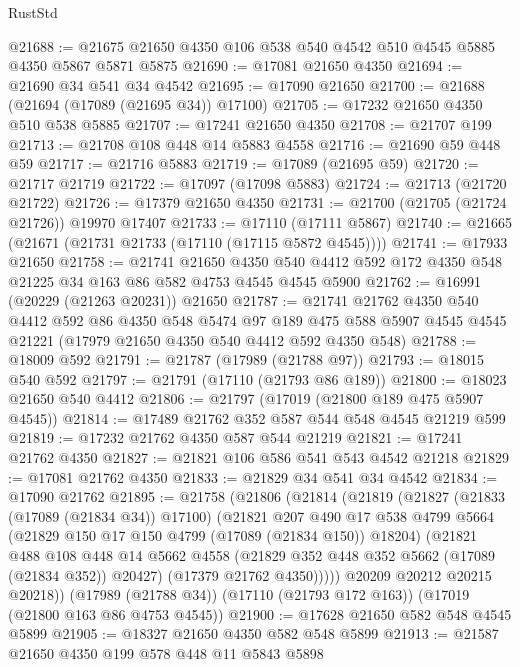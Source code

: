 \begin{lexlean}{RustStd}
\begin{coremodule}
@21688 := @21675 @21650 @4350 @106 @538 @540 @4542 @510 @4545 @5885 @4350 @5867 @5871 @5875
@21690 := @17081 @21650 @4350
@21694 := @21690 @34 @541 @34 @4542
@21695 := @17090 @21650
@21700 := @21688 (@21694 (@17089 (@21695 @34)) @17100)
@21705 := @17232 @21650 @4350 @510 @538 @5885
@21707 := @17241 @21650 @4350
@21708 := @21707 @199
@21713 := @21708 @108 @448 @14 @5883 @4558
@21716 := @21690 @59 @448 @59
@21717 := @21716 @5883
@21719 := @17089 (@21695 @59)
@21720 := @21717 @21719
@21722 := @17097 (@17098 @5883)
@21724 := @21713 (@21720 @21722)
@21726 := @17379 @21650 @4350
@21731 := @21700 (@21705 (@21724 @21726)) @19970 @17407
@21733 := @17110 (@17111 @5867)
@21740 := @21665 (@21671 (@21731 @21733 (@17110 (@17115 @5872 @4545))))
@21741 := @17933 @21650
@21758 := @21741
    @21650
    @4350
    @540
    @4412
    @592
    @172
    @4350
    @548
    @21225
    @34
    @163
    @86
    @582
    @4753
    @4545
    @4545
    @5900
@21762 := @16991 (@20229 (@21263 @20231)) @21650
@21787 := @21741
    @21762
    @4350
    @540
    @4412
    @592
    @86
    @4350
    @548
    @5474
    @97
    @189
    @475
    @588
    @5907
    @4545
    @4545
    @21221
    (@17979 @21650 @4350 @540 @4412 @592 @4350 @548)
@21788 := @18009 @592
@21791 := @21787 (@17989 (@21788 @97))
@21793 := @18015 @540 @592
@21797 := @21791 (@17110 (@21793 @86 @189))
@21800 := @18023 @21650 @540 @4412
@21806 := @21797 (@17019 (@21800 @189 @475 @5907 @4545))
@21814 := @17489 @21762 @352 @587 @544 @548 @4545 @21219 @599
@21819 := @17232 @21762 @4350 @587 @544 @21219
@21821 := @17241 @21762 @4350
@21827 := @21821 @106 @586 @541 @543 @4542 @21218
@21829 := @17081 @21762 @4350
@21833 := @21829 @34 @541 @34 @4542
@21834 := @17090 @21762
@21895 := @21758
    (@21806
      (@21814
        (@21819
          (@21827
            (@21833 (@17089 (@21834 @34)) @17100)
            (@21821
              @207
              @490
              @17
              @538
              @4799
              @5664
              (@21829 @150 @17 @150 @4799 (@17089 (@21834 @150)) @18204)
              (@21821
                @488
                @108
                @448
                @14
                @5662
                @4558
                (@21829 @352 @448 @352 @5662 (@17089 (@21834 @352)) @20427)
                (@17379 @21762 @4350)))))
        @20209
        @20212
        @20215
        @20218))
    (@17989 (@21788 @34))
    (@17110 (@21793 @172 @163))
    (@17019 (@21800 @163 @86 @4753 @4545))
@21900 := @17628 @21650 @582 @548 @4545 @5899
@21905 := @18327 @21650 @4350 @582 @548 @5899
@21913 := @21587 @21650 @4350 @199 @578 @448 @11 @5843 @5898

\end{coremodule}
\end{lexlean}
